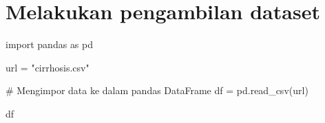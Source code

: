 \documentclass[
  letterpaper,
]{krantz}
\makeatletter
\newenvironment{Shaded}{\begin{snugshade}}{\end{snugshade}}
\newcommand{\CommentTok}[1]{\textcolor[rgb]{0.37,0.37,0.37}{#1}}
\newcommand{\ImportTok}[1]{\textcolor[rgb]{0.00,0.46,0.62}{#1}}
\newcommand{\NormalTok}[1]{\textcolor[rgb]{0.00,0.23,0.31}{#1}}
\newcommand{\OperatorTok}[1]{\textcolor[rgb]{0.37,0.37,0.37}{#1}}
\newcommand{\StringTok}[1]{\textcolor[rgb]{0.13,0.47,0.30}{#1}}
\newenvironment{kframe}{%
\medskip{}
\setlength{\fboxsep}{.8em}
 \def\at@end@of@kframe{}%
 \ifinner\ifhmode%
  \def\at@end@of@kframe{\end{minipage}}%
  \begin{minipage}{\columnwidth}%
 \fi\fi%
 \def\FrameCommand##1{\hskip\@totalleftmargin \hskip-\fboxsep
 \colorbox{shadecolor}{##1}\hskip-\fboxsep
     \hskip-\linewidth \hskip-\@totalleftmargin \hskip\columnwidth}%
 \MakeFramed {\advance\hsize-\width
   \@totalleftmargin\z@ \linewidth\hsize
   \@setminipage}}%
 {\par\unskip\endMakeFramed%
 \at@end@of@kframe}
\renewenvironment{Shaded}{\begin{kframe}}{\end{kframe}}
\makeatother
\begin{document}
\hypertarget{melakukan-pengambilan-dataset}{%
\section*{Melakukan pengambilan
dataset}\label{melakukan-pengambilan-dataset}}


\begin{Shaded}
\begin{Highlighting}[]
\ImportTok{import}\NormalTok{ pandas }\ImportTok{as}\NormalTok{ pd}

\NormalTok{url }\OperatorTok{=} \StringTok{"cirrhosis.csv"}

\CommentTok{\# Mengimpor data ke dalam pandas DataFrame}
\NormalTok{df }\OperatorTok{=}\NormalTok{ pd.read\_csv(url)}

\NormalTok{df}
\end{Highlighting}
\end{Shaded}
\end{document}
